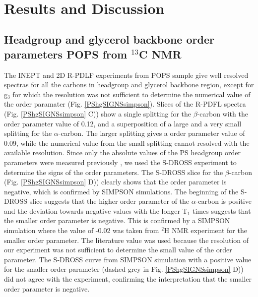 \documentclass[aps,prl,superscriptaddress,twocolumn]{revtex4}
\begin{document}
 \\

\section{Results and Discussion}

\subsection{Headgroup and glycerol backbone order parameters POPS from $^{13}$C NMR}

The INEPT and 2D R-PDLF experiments from POPS sample give well resolved spectras for all the
carbons in headgroup and glycerol backbone region, except for g$_3$ for which the resolution
was not sufficient to determine the numerical value of the order paramater (Fig. \ref{PShgSIGNSsimpson}).
Slices of the R-PDFL spectra (Fig. \ref{PShgSIGNSsimpson} C)) 
show a single splitting for the $\beta$-carbon with the order parameter value of 0.12,
and a superposition of a large and a very small splitting for the $\alpha$-carbon.
The larger splitting gives a order parameter value of 0.09, while the numerical value
from the small splitting cannot resolved with the available resolution.
Since only the absolute values of the PS headgroup order parameters were measured
previously \cite{browning80,roux91}, we used the S-DROSS experiment \cite{gross97} to determine the signs of
the order parameters. The S-DROSS slice for the $\beta$-carbon (Fig. \ref{PShgSIGNSsimpson} D)) clearly shows that the
order parameter is negative, which is confirmed by SIMPSON simulations.
The beginning of the S-DROSS slice suggests that the higher order parameter of
the $\alpha$-carbon is positive and the deviation towards negative values with the longer T$_1$ times suggests
that the smaller order parameter is negative. This is confirmed by a SIMPSON simulation
where the value of -0.02 was taken from $^2$H NMR experiment \cite{roux91} for the smaller order parameter.
The literature value was used because the
resolution of our experiment was not sufficient to determine the
small value of the order parameter. The S-DROSS curve from
SIMPSON simulation with a positive value for the smaller order parameter
(dashed grey in Fig. \ref{PShgSIGNSsimpson} D)) did not agree with the experiment, 
confirming the interpretation that the smaller order parameter is negative.
\end{document}
